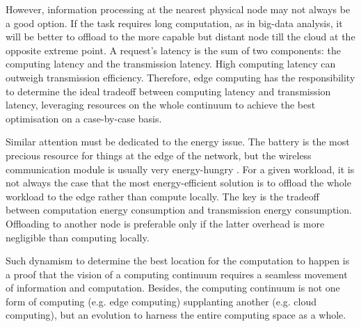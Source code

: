 However, information processing at the nearest physical node may not always be a good option. If the task requires long computation, as in big-data analysis, it will be better to offload to the more capable but distant node till the cloud at the opposite extreme point. A request's latency is the sum of two components: the computing latency and the transmission latency. High computing latency can outweigh transmission efficiency. Therefore, edge computing has the responsibility to determine the ideal tradeoff between computing latency and transmission latency, leveraging resources on the whole continuum to achieve the best optimisation on a case-by-case basis.

Similar attention must be dedicated to the energy issue. The battery is the most precious resource for things at the edge of the network, but the wireless communication module is usually very energy-hungry \cite{shi2016edge}. For a given workload, it is not always the case that the most energy-efficient solution is to offload the whole workload to the edge rather than compute locally. The key is the tradeoff between computation energy consumption and transmission energy consumption. Offloading to another node is preferable only if the latter overhead is more negligible than computing locally.

Such dynamism to determine the best location for the computation to happen is a proof that the vision of a computing continuum requires a seamless movement of information and computation. Besides, the computing continuum is not one form of computing (e.g. edge computing) supplanting another (e.g. cloud computing), but an evolution to harness the entire computing space as a whole.




